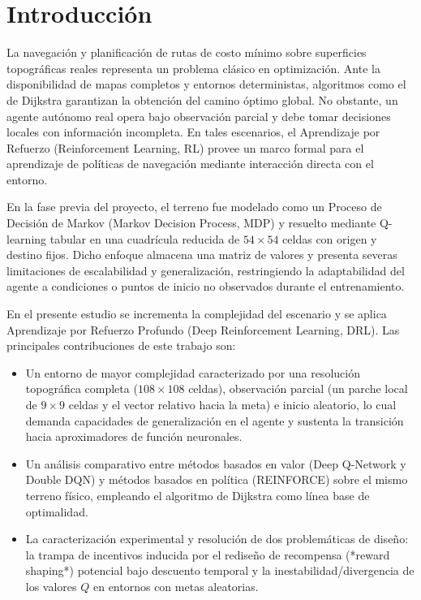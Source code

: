 \section{Introducción}
La navegación y planificación de rutas de costo mínimo sobre superficies topográficas reales representa un problema clásico en optimización. Ante la disponibilidad de mapas completos y entornos deterministas, algoritmos como el de Dijkstra garantizan la obtención del camino óptimo global. No obstante, un agente autónomo real opera bajo observación parcial y debe tomar decisiones locales con información incompleta. En tales escenarios, el Aprendizaje por Refuerzo (Reinforcement Learning, RL) provee un marco formal para el aprendizaje de políticas de navegación mediante interacción directa con el entorno.

En la fase previa del proyecto, el terreno fue modelado como un Proceso de Decisión de Markov (Markov Decision Process, MDP) y resuelto mediante Q-learning tabular en una cuadrícula reducida de $54\times54$ celdas con origen y destino fijos. Dicho enfoque almacena una matriz de valores y presenta severas limitaciones de escalabilidad y generalización, restringiendo la adaptabilidad del agente a condiciones o puntos de inicio no observados durante el entrenamiento.

En el presente estudio se incrementa la complejidad del escenario y se aplica Aprendizaje por Refuerzo Profundo (Deep Reinforcement Learning, DRL). Las principales contribuciones de este trabajo son:
\begin{itemize}
  \item Un entorno de mayor complejidad caracterizado por una resolución topográfica completa ($108\times108$ celdas), observación parcial (un parche local de $9\times9$ celdas y el vector relativo hacia la meta) e inicio aleatorio, lo cual demanda capacidades de generalización en el agente y sustenta la transición hacia aproximadores de función neuronales.
  \item Un análisis comparativo entre métodos basados en valor (Deep Q-Network y Double DQN) y métodos basados en política (REINFORCE) sobre el mismo terreno físico, empleando el algoritmo de Dijkstra como línea base de optimalidad.
  \item La caracterización experimental y resolución de dos problemáticas de diseño: la trampa de incentivos inducida por el rediseño de recompensa (*reward shaping*) potencial bajo descuento temporal y la inestabilidad/divergencia de los valores $Q$ en entornos con metas aleatorias.
\end{itemize}

